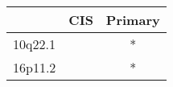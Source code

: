 \begin{tabular}{lcc}
\toprule
{} & CIS & Primary \\
\midrule
10q22.1 &     &       * \\
16p11.2 &     &       * \\
\bottomrule
\end{tabular}
